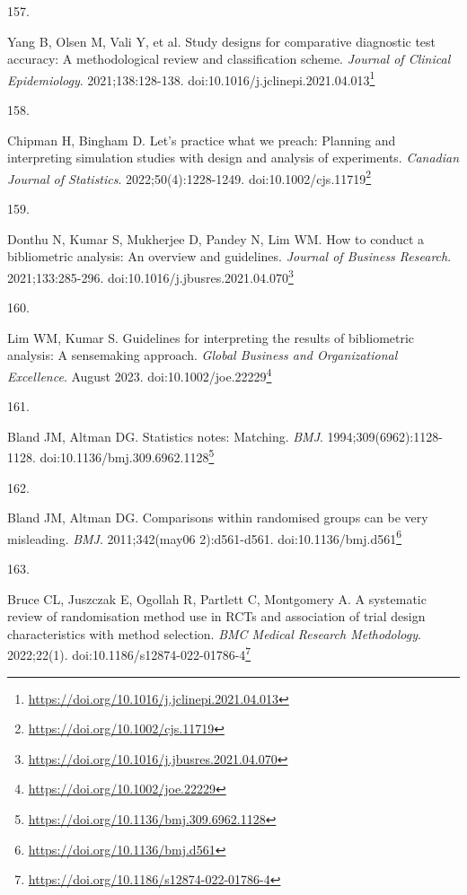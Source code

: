 \documentclass[
  a4paper,
]{book}
\newlength{\cslhangindent}
\newlength{\csllabelwidth}
\newlength{\cslentryspacingunit} %
\newenvironment{CSLReferences}[2] %
 {%
  \setlength{\parindent}{0pt}
  \ifodd #1
  \let\oldpar\par
  \def\par{\hangindent=\cslhangindent\oldpar}
  \fi
  \setlength{\parskip}{#2\cslentryspacingunit}
 }%
 {}
\newcommand{\CSLLeftMargin}[1]{\parbox[t]{\csllabelwidth}{#1}}
\newcommand{\CSLRightInline}[1]{\parbox[t]{\linewidth - \csllabelwidth}{#1}\break}
\renewcommand{\href}[2]{#2\footnote{\url{#1}}}
\begin{document}
\begin{CSLReferences}{0}{0}
\leavevmode{}%
\CSLLeftMargin{157. }%
\CSLRightInline{Yang B, Olsen M, Vali Y, et al. Study designs for comparative diagnostic test accuracy: A methodological review and classification scheme. \emph{Journal of Clinical Epidemiology}. 2021;138:128-138. doi:\href{https://doi.org/10.1016/j.jclinepi.2021.04.013}{10.1016/j.jclinepi.2021.04.013}}

\leavevmode{}%
\CSLLeftMargin{158. }%
\CSLRightInline{Chipman H, Bingham D. Let's practice what we preach: Planning and interpreting simulation studies with design and analysis of experiments. \emph{Canadian Journal of Statistics}. 2022;50(4):1228-1249. doi:\href{https://doi.org/10.1002/cjs.11719}{10.1002/cjs.11719}}

\leavevmode{}%
\CSLLeftMargin{159. }%
\CSLRightInline{Donthu N, Kumar S, Mukherjee D, Pandey N, Lim WM. How to conduct a bibliometric analysis: An overview and guidelines. \emph{Journal of Business Research}. 2021;133:285-296. doi:\href{https://doi.org/10.1016/j.jbusres.2021.04.070}{10.1016/j.jbusres.2021.04.070}}

\leavevmode{}%
\CSLLeftMargin{160. }%
\CSLRightInline{Lim WM, Kumar S. Guidelines for interpreting the results of bibliometric analysis: A sensemaking approach. \emph{Global Business and Organizational Excellence}. August 2023. doi:\href{https://doi.org/10.1002/joe.22229}{10.1002/joe.22229}}

\leavevmode{}%
\CSLLeftMargin{161. }%
\CSLRightInline{Bland JM, Altman DG. Statistics notes: Matching. \emph{BMJ}. 1994;309(6962):1128-1128. doi:\href{https://doi.org/10.1136/bmj.309.6962.1128}{10.1136/bmj.309.6962.1128}}

\leavevmode{}%
\CSLLeftMargin{162. }%
\CSLRightInline{Bland JM, Altman DG. Comparisons within randomised groups can be very misleading. \emph{BMJ}. 2011;342(may06 2):d561-d561. doi:\href{https://doi.org/10.1136/bmj.d561}{10.1136/bmj.d561}}

\leavevmode{}%
\CSLLeftMargin{163. }%
\CSLRightInline{Bruce CL, Juszczak E, Ogollah R, Partlett C, Montgomery A. A systematic review of randomisation method use in RCTs and association of trial design characteristics with method selection. \emph{BMC Medical Research Methodology}. 2022;22(1). doi:\href{https://doi.org/10.1186/s12874-022-01786-4}{10.1186/s12874-022-01786-4}}


\end{CSLReferences}
\end{document}
